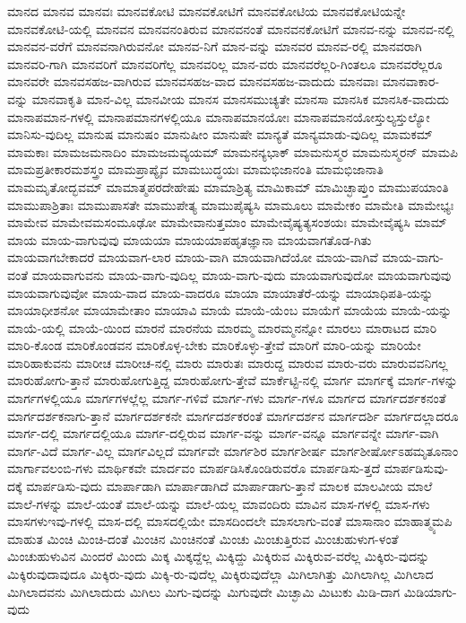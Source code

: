 {ಮಾನದ
ಮಾನವ
ಮಾನವಃ
ಮಾನವಕೋಟಿ
ಮಾನವಕೋಟಿಗೆ
ಮಾನವಕೋಟಿಯ
ಮಾನವಕೋಟಿಯನ್ನೇ
ಮಾನವಕೋಟಿ-ಯಲ್ಲಿ
ಮಾನವನ
ಮಾನವನಂತಿರುವ
ಮಾನವನಂತೆ
ಮಾನವನಕೋಟಿಗೆ
ಮಾನವ-ನನ್ನು
ಮಾನವ-ನಲ್ಲಿ
ಮಾನವನ-ವರೆಗೆ
ಮಾನವನಾಗಿರುವನೋ
ಮಾನವ-ನಿಗೆ
ಮಾನ-ವನ್ನು
ಮಾನವರ
ಮಾನವ-ರಲ್ಲಿ
ಮಾನವರಾಗಿ
ಮಾನವರಿ-ಗಾಗಿ
ಮಾನವರಿಗೆ
ಮಾನವರಿಗೆಲ್ಲ
ಮಾನವರಿಲ್ಲ
ಮಾನ-ವರು
ಮಾನವರೆಲ್ಲರಿ-ಗಿಂತಲೂ
ಮಾನವರೆಲ್ಲರೂ
ಮಾನವರೇ
ಮಾನವಸಹಜ-ವಾಗಿರುವ
ಮಾನವಸಹಜ-ವಾದ
ಮಾನವಸಹಜ-ವಾದುದು
ಮಾನವಾಃ
ಮಾನವಾಕಾರ-ವನ್ನು
ಮಾನವಾಕೃತಿ
ಮಾನ-ವಿಲ್ಲ
ಮಾನವೀಯ
ಮಾನಸ
ಮಾನಸಮುಚ್ಯತೇ
ಮಾನಸಾ
ಮಾನಸಿಕ
ಮಾನಸಿಕ-ವಾದುದು
ಮಾನಾಪಮಾನ-ಗಳಲ್ಲಿ
ಮಾನಾಪಮಾನಗಳಲ್ಲಿಯೂ
ಮಾನಾಪಮಾನಯೋಃ
ಮಾನಾಪಮಾನಯೋಸ್ತುಲ್ಯಸ್ತುಲ್ಯೋ
ಮಾನಿಸು-ವುದಿಲ್ಲ
ಮಾನುಷ
ಮಾನುಷಂ
ಮಾನುಷೀಂ
ಮಾನುಷೇ
ಮಾನ್ಯತೆ
ಮಾನ್ಯಮಾಡು-ವುದಿಲ್ಲ
ಮಾಮಕಮ್
ಮಾಮಕಾಃ
ಮಾಮಜಮನಾದಿಂ
ಮಾಮಜಮವ್ಯಯಮ್
ಮಾಮನನ್ಯಭಾಕ್
ಮಾಮನುಸ್ಮರ
ಮಾಮನುಸ್ಮರನ್
ಮಾಮಪಿ
ಮಾಮಪ್ರತೀಕಾರಮಶಸ್ತ್ರಂ
ಮಾಮಪ್ರಾಪ್ಯೈವ
ಮಾಮಬುದ್ಧಯಃ
ಮಾಮಭಿಜಾನಂತಿ
ಮಾಮಭಿಜಾನಾತಿ
ಮಾಮಮೃತೋದ್ಭವಮ್
ಮಾಮಾತ್ಮಪರದೇಹೇಷು
ಮಾಮಾಶ್ರಿತ್ಯ
ಮಾಮಿಕಾಮ್
ಮಾಮಿಚ್ಛಾಪ್ತುಂ
ಮಾಮುಪಯಾಂತಿ
ಮಾಮುಪಾಶ್ರಿತಾಃ
ಮಾಮುಪಾಸತೇ
ಮಾಮುಪೇತ್ಯ
ಮಾಮುಪೈಷ್ಯಸಿ
ಮಾಮೂಲು
ಮಾಮೇಕಂ
ಮಾಮೇತಿ
ಮಾಮೇಭ್ಯಃ
ಮಾಮೇವ
ಮಾಮೇವಮಸಂಮೂಢೋ
ಮಾಮೇವಾನುತ್ತಮಾಂ
ಮಾಮೇವೈಷ್ಯತ್ಯಸಂಶಯಃ
ಮಾಮೇವೈಷ್ಯಸಿ
ಮಾಮ್
ಮಾಯ
ಮಾಯ-ವಾಗುವುವು
ಮಾಯಯಾ
ಮಾಯಯಾಪಹೃತಜ್ಞಾನಾ
ಮಾಯವಾಗತೊಡ-ಗಿತು
ಮಾಯವಾಗಬೇಕಾದರೆ
ಮಾಯವಾಗ-ಲಾರ
ಮಾಯ-ವಾಗಿ
ಮಾಯವಾಗಿದೆಯೋ
ಮಾಯ-ವಾಗಿವೆ
ಮಾಯ-ವಾಗು-ವಂತೆ
ಮಾಯವಾಗುವನು
ಮಾಯ-ವಾಗು-ವುದಿಲ್ಲ
ಮಾಯ-ವಾಗು-ವುದು
ಮಾಯವಾಗುವುದೋ
ಮಾಯವಾಗುವುವು
ಮಾಯವಾಗುವುವೋ
ಮಾಯ-ವಾದ
ಮಾಯ-ವಾದರೂ
ಮಾಯಾ
ಮಾಯಾತೆರೆ-ಯನ್ನು
ಮಾಯಾಧಿಪತಿ-ಯನ್ನು
ಮಾಯಾಧೀಶನೋ
ಮಾಯಾಮೇತಾಂ
ಮಾಯಾವಿ
ಮಾಯೆ
ಮಾಯೆ-ಯೆಂಬ
ಮಾಯೆಗೆ
ಮಾಯೆಯ
ಮಾಯೆ-ಯನ್ನು
ಮಾಯೆ-ಯಲ್ಲಿ
ಮಾಯೆ-ಯಿಂದ
ಮಾರನೆ
ಮಾರನೆಯ
ಮಾರಮ್ಮ
ಮಾರಮ್ಮನನ್ನೋ
ಮಾರಲು
ಮಾರಾಟದ
ಮಾರಿ
ಮಾರಿ-ಕೊಂಡ
ಮಾರಿಕೊಂಡವನ
ಮಾರಿಕೊಳ್ಳ-ಬೇಕು
ಮಾರಿಕೊಳ್ಳು-ತ್ತೇವೆ
ಮಾರಿಗೆ
ಮಾರಿ-ಯನ್ನು
ಮಾರಿಯೇ
ಮಾರಿಹಾಕುವನು
ಮಾರೀಚ
ಮಾರೀಚ-ನಲ್ಲಿ
ಮಾರು
ಮಾರುತಃ
ಮಾರುದ್ದ
ಮಾರುವ
ಮಾರು-ವರು
ಮಾರುವವನಿಗಲ್ಲ
ಮಾರುಹೋಗು-ತ್ತಾನೆ
ಮಾರುಹೋಗುತ್ತಿದ್ದ
ಮಾರುಹೋಗು-ತ್ತೇವೆ
ಮಾರ್ಕೆಟ್ಟಿ-ನಲ್ಲಿ
ಮಾರ್ಗ
ಮಾರ್ಗಕ್ಕೆ
ಮಾರ್ಗ-ಗಳನ್ನು
ಮಾರ್ಗಗಳಲ್ಲಿಯೂ
ಮಾರ್ಗಗಳಲ್ಲೆಲ್ಲ
ಮಾರ್ಗ-ಗಳಿವೆ
ಮಾರ್ಗ-ಗಳು
ಮಾರ್ಗ-ಗಳೂ
ಮಾರ್ಗದ
ಮಾರ್ಗದರ್ಶಕನಂತೆ
ಮಾರ್ಗದರ್ಶಕನಾಗು-ತ್ತಾನೆ
ಮಾರ್ಗದರ್ಶಕನೇ
ಮಾರ್ಗದರ್ಶಕರಂತೆ
ಮಾರ್ಗದರ್ಶನ
ಮಾರ್ಗದರ್ಶಿ
ಮಾರ್ಗದಲ್ಲಾದರೂ
ಮಾರ್ಗ-ದಲ್ಲಿ
ಮಾರ್ಗದಲ್ಲಿಯೂ
ಮಾರ್ಗ-ದಲ್ಲಿರುವ
ಮಾರ್ಗ-ವನ್ನು
ಮಾರ್ಗ-ವನ್ನೂ
ಮಾರ್ಗವನ್ನೇ
ಮಾರ್ಗ-ವಾಗಿ
ಮಾರ್ಗ-ವಿದೆ
ಮಾರ್ಗ-ವಿಲ್ಲ
ಮಾರ್ಗವಿಲ್ಲದೆ
ಮಾರ್ಗವೇ
ಮಾರ್ಗಶಿರ
ಮಾರ್ಗಶೀರ್ಷ
ಮಾರ್ಗಶೀರ್ಷೋಽಹಮೃತೂನಾಂ
ಮಾರ್ಗಾವಲಂಬಿ-ಗಳು
ಮಾರ್ಥಿಕವೇ
ಮಾರ್ದವಂ
ಮಾರ್ಪಡಿಸಿಕೊಂಡಿರುವರೊ
ಮಾರ್ಪಡಿಸು-ತ್ತದೆ
ಮಾರ್ಪಡಿಸುವು-ದಕ್ಕೆ
ಮಾರ್ಪಡಿಸು-ವುದು
ಮಾರ್ಪಾಡಾಗಿ
ಮಾರ್ಪಾಡಾಗಿದೆ
ಮಾರ್ಪಾಡಾಗು-ತ್ತಾನೆ
ಮಾಲಕ
ಮಾಲವೀಯ
ಮಾಲೆ
ಮಾಲೆ-ಗಳನ್ನು
ಮಾಲೆ-ಯಂತೆ
ಮಾಲೆ-ಯನ್ನು
ಮಾಲೆ-ಯಲ್ಲ
ಮಾವಂದಿರು
ಮಾವಿನ
ಮಾಸ-ಗಳಲ್ಲಿ
ಮಾಸ-ಗಳು
ಮಾಸಗಳುಇವು-ಗಳಲ್ಲಿ
ಮಾಸ-ದಲ್ಲಿ
ಮಾಸದಲ್ಲಿಯೇ
ಮಾಸದಿಂದಲೇ
ಮಾಸಲಾಗು-ವಂತೆ
ಮಾಸಾನಾಂ
ಮಾಹಾತ್ಮ್ಯಮಪಿ
ಮಾಹುತ
ಮಿಂಚಿ
ಮಿಂಚಿ-ದಂತೆ
ಮಿಂಚಿನ
ಮಿಂಚಿನಂತೆ
ಮಿಂಚು
ಮಿಂಚುತ್ತಿರುವ
ಮಿಂಚುಹುಳುಗ-ಳಂತೆ
ಮಿಂಚುಹುಳುವಿನ
ಮಿಂದರೆ
ಮಿಂದು
ಮಿಕ್ಕ
ಮಿಕ್ಕದ್ದೆಲ್ಲ
ಮಿಕ್ಕಿದ್ದು
ಮಿಕ್ಕಿರುವ
ಮಿಕ್ಕಿರುವ-ವರೆಲ್ಲ
ಮಿಕ್ಕಿರು-ವುದನ್ನು
ಮಿಕ್ಕಿರುವುದಾವುದೂ
ಮಿಕ್ಕಿರು-ವುದು
ಮಿಕ್ಕಿ-ರು-ವುದೆಲ್ಲ
ಮಿಕ್ಕಿರುವುದೆಲ್ಲಾ
ಮಿಗಿಲಾಗಿತ್ತು
ಮಿಗಿಲಾಗಿಲ್ಲ
ಮಿಗಿಲಾದ
ಮಿಗಿಲಾದವನು
ಮಿಗಿಲಾದುದು
ಮಿಗಿಲು
ಮಿಗು-ವುದನ್ನು
ಮಿಗುವುದೇ
ಮಿಚ್ಛಾಮಿ
ಮಿಟುಕು
ಮಿಡಿ-ದಾಗ
ಮಿಡಿಯಾಗು-ವುದು
}
